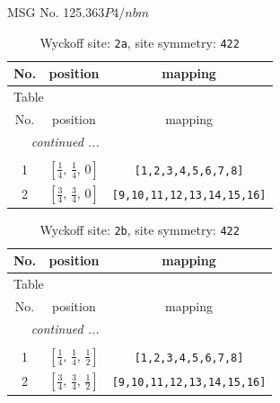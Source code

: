 \documentclass[fleqn,8pt]{jsarticle}
\begin{document}
\setcounter{MaxMatrixCols}{32}

\renewcommand{\tablename}{Table~}
\renewcommand{\figurename}{Figure~}
\begin{center}
\LARGE
MSG No. 125.363\quad$P4/nbm$
\end{center}
\renewcommand{\arraystretch}{1.2}
\begin{longtable}{ccc}
\caption{Wyckoff site: {\tt 2a}, site symmetry: {\tt 422}}
 \\
 \hline \hline
No. & position & mapping \\ \hline \endfirsthead

\multicolumn{2}{l}{\tablename\ \thetable{}} \\
 \hline \hline
No. & position & mapping \\ \hline \endhead

 \hline \hline
\multicolumn{2}{r}{\footnotesize\it continued ...} \\ \endfoot

 \hline \hline
\multicolumn{2}{r}{} \\ \endlastfoot

1 & $\left[ \frac{1}{4},\, \frac{1}{4},\, 0 \right]$ & {\tt [1,2,3,4,5,6,7,8]} \\ \hline
2 & $\left[ \frac{3}{4},\, \frac{3}{4},\, 0 \right]$ & {\tt [9,10,11,12,13,14,15,16]} \\
\end{longtable}
\renewcommand{\arraystretch}{1.2}
\begin{longtable}{ccc}
\caption{Wyckoff site: {\tt 2b}, site symmetry: {\tt 422}}
 \\
 \hline \hline
No. & position & mapping \\ \hline \endfirsthead

\multicolumn{2}{l}{\tablename\ \thetable{}} \\
 \hline \hline
No. & position & mapping \\ \hline \endhead

 \hline \hline
\multicolumn{2}{r}{\footnotesize\it continued ...} \\ \endfoot

 \hline \hline
\multicolumn{2}{r}{} \\ \endlastfoot

1 & $\left[ \frac{1}{4},\, \frac{1}{4},\, \frac{1}{2} \right]$ & {\tt [1,2,3,4,5,6,7,8]} \\ \hline
2 & $\left[ \frac{3}{4},\, \frac{3}{4},\, \frac{1}{2} \right]$ & {\tt [9,10,11,12,13,14,15,16]} \\
\end{longtable}
\end{document}
